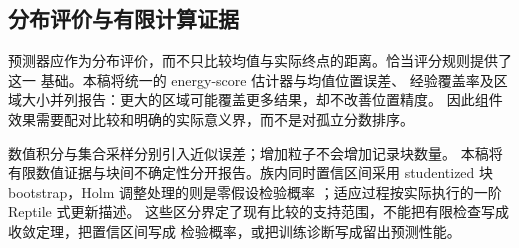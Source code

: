 \documentclass[UTF8,11pt]{ctexart}
\begin{document}
\subsection{分布评价与有限计算证据}
预测器应作为分布评价，而不只比较均值与实际终点的距离。恰当评分规则提供了这一
基础\cite{gneiting2007,gneiting2008}。本稿将统一的 energy-score 估计器与均值位置误差、
经验覆盖率及区域大小并列报告：更大的区域可能覆盖更多结果，却不改善位置精度。
因此组件效果需要配对比较和明确的实际意义界，而不是对孤立分数排序。

数值积分与集合采样分别引入近似误差\cite{kloeden1992}；增加粒子不会增加记录块数量。
本稿将有限数值证据与块间不确定性分开报告。族内同时置信区间采用 studentized
块 bootstrap\cite{davison1997}，Holm 调整处理的则是零假设检验概率
\cite{holm1979}；适应过程按实际执行的一阶 Reptile 式更新描述\cite{nichol2018}。
这些区分界定了现有比较的支持范围，不能把有限检查写成收敛定理，把置信区间写成
检验概率，或把训练诊断写成留出预测性能。
\end{document}
